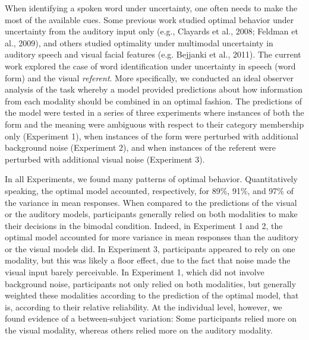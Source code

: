 \documentclass[english,floatsintext,man]{apa6}
\theoremstyle{definition}
\theoremstyle{definition}
\theoremstyle{definition}
\theoremstyle{remark}
\begin{document}
When identifying a spoken word under uncertainty, one often needs to
make the most of the available cues. Some previous work studied optimal
behavior under uncertainty from the auditory input only (e.g., Clayards
et al., 2008; Feldman et al., 2009), and others studied optimality under
multimodal uncertainty in auditory speech and visual facial features
(e.g. Bejjanki et al., 2011). The current work explored the case of word
identification under uncertainty in speech (word form) and the visual
\emph{referent}. More specifically, we conducted an ideal observer
analysis of the task whereby a model provided predictions about how
information from each modality should be combined in an optimal fashion.
The predictions of the model were tested in a series of three
experiments where instances of both the form and the meaning were
ambiguous with respect to their category membership only (Experiment 1),
when instances of the form were perturbed with additional background
noise (Experiment 2), and when instances of the referent were perturbed
with additional visual noise (Experiment 3).

In all Experiments, we found many patterns of optimal behavior.
Quantitatively speaking, the optimal model accounted, respectively, for
89\%, 91\%, and 97\% of the variance in mean responses. When compared to
the predictions of the visual or the auditory models, participants
generally relied on both modalities to make their decisions in the
bimodal condition. Indeed, in Experiment 1 and 2, the optimal model
accounted for more variance in mean responses than the auditory or the
visual models did. In Experiment 3, participants appeared to rely on one
modality, but this was likely a floor effect, due to the fact that noise
made the visual input barely perceivable. In Experiment 1, which did not
involve background noise, participants not only relied on both
modalities, but generally weighted these modalities according to the
prediction of the optimal model, that is, according to their relative
reliability. At the individual level, however, we found evidence of a
between-subject variation: Some participants relied more on the visual
modality, whereas others relied more on the auditory modality.
\end{document}

